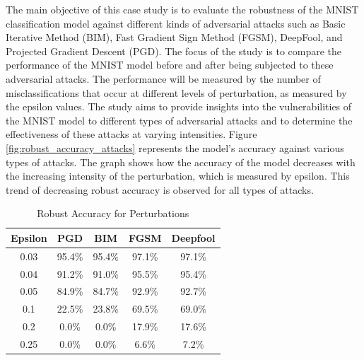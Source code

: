 \documentclass[10pt, conference, a4paper, final]{IEEEtran}
\begin{document}
The main objective of this case study is to evaluate the robustness of the MNIST classification model 
against different kinds of adversarial attacks such as Basic Iterative Method (BIM), Fast Gradient Sign Method (FGSM), 
DeepFool, and Projected Gradient Descent (PGD). The focus of the study is to compare the performance of the MNIST model
before and after being subjected to these adversarial attacks. The performance will be measured by the number of misclassifications
that occur at different levels of perturbation, as measured by the epsilon values. The study aims to provide insights into the
vulnerabilities of the MNIST model to different types of adversarial attacks and to determine the effectiveness of these attacks 
at varying intensities. Figure \ref {fig:robust_accuracy_attacks} represents the model's accuracy against various types of attacks. 
The graph shows how the accuracy of the model decreases with the increasing intensity of the perturbation, which is measured by epsilon.
This trend of decreasing robust accuracy is observed for all types of attacks.


\begin{table}[ht]
    \centering
    \caption{Robust Accuracy for Perturbations}
    \label{tab:robust_accuracy}
    \begin{tabular}{|c|c|c|c|c|}
    \hline
    Epsilon & PGD & BIM & FGSM & Deepfool \\
    \hline
    0.03 & 95.4\% & 95.4\% & 97.1\% & 97.1\% \\
    0.04 & 91.2\% & 91.0\% & 95.5\% & 95.4\% \\
    0.05 & 84.9\% & 84.7\% & 92.9\% & 92.7\% \\
    0.1 & 22.5\% & 23.8\% & 69.5\% & 69.0\% \\
    0.2 & 0.0\% & 0.0\% & 17.9\% & 17.6\% \\
    0.25 & 0.0\% & 0.0\% & 6.6\% & 7.2\% \\
    \hline
    \end{tabular}
    \end{table}
    
\end{document}
